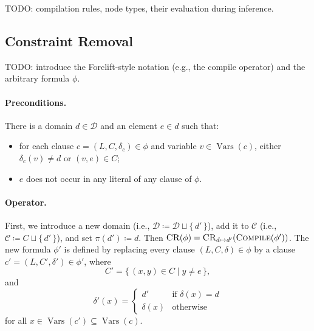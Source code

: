 \documentclass{article}
\theoremstyle{definition}
\DeclareMathOperator{\Compile}{\textsc{Compile}}
\DeclareMathOperator{\CR}{\textsc{CR}}
\DeclareMathOperator{\Vars}{Vars}
\begin{document}
TODO: compilation rules, node types, their evaluation during inference.

\subsection{Constraint Removal}

TODO: introduce the Forclift-style notation (e.g., the compile operator) and the arbitrary formula $\phi$.

\paragraph{Preconditions.} There is a domain $d \in \mathscr{D}$ and an element $e \in d$ such that:
\begin{itemize}
\item for each clause $c = (L, C, \delta_c) \in \phi$ and variable $v \in \Vars(c)$, either $\delta_c(v) \ne d$ or $(v, e) \in C$;
\item $e$ does not occur in any literal of any clause of $\phi$.
\end{itemize}

\paragraph{Operator.} First, we introduce a new domain (i.e., $\mathscr{D} \coloneqq \mathscr{D} \sqcup \{\, d' \,\}$), add it to $\mathscr{C}$ (i.e., $\mathscr{C} \coloneqq C \sqcup \{\, d' \,\}$), and set $\pi(d') \coloneqq d$. Then $\CR(\phi) = \CR_{d \mapsto d'}(\Compile(\phi'))$. The new formula $\phi'$ is defined by replacing every clause $(L, C, \delta) \in \phi$ by a clause $c' = (L, C', \delta') \in \phi'$, where
\[
C' = \{\, (x, y) \in C \mid y \ne e \,\},
\]
and
\[
\delta'(x) =
\begin{cases}
  d' & \text{if } \delta(x) = d \\
  \delta(x) & \text{otherwise}
\end{cases}
\]
for all $x \in \Vars(c') \subseteq \Vars(c)$.
\end{document}
